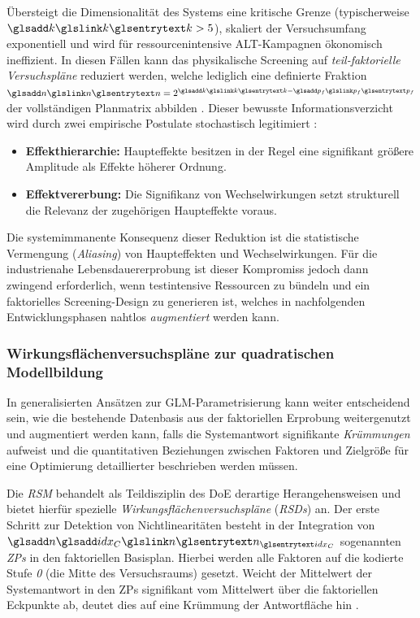 Übersteigt die Dimensionalität des Systems eine kritische Grenze (typischerweise $\sym{k} > 5$), skaliert der Versuchsumfang exponentiell und wird für ressourcenintensive \ac{ALT}-Kampagnen ökonomisch ineffizient.
In diesen Fällen kann das physikalische Screening auf \textit{teil-faktorielle Versuchspläne} reduziert werden, welche lediglich eine definierte Fraktion $\sym{n} = 2^{\sym{k}-\sym{p_f}}$ der vollständigen Planmatrix abbilden \cite{Montgomery.2021,Siebertz.2026}.
Dieser bewusste Informationsverzicht wird durch zwei empirische Postulate stochastisch legitimiert \cite{Montgomery.2021,Rigdon.2022}:
\begin{itemize}
    \item \textbf{Effekthierarchie:} Haupteffekte besitzen in der Regel eine signifikant größere Amplitude als Effekte höherer Ordnung.
    \item \textbf{Effektvererbung:} Die Signifikanz von Wechselwirkungen setzt strukturell die Relevanz der zugehörigen Haupteffekte voraus.
\end{itemize}
Die systemimmanente Konsequenz dieser Reduktion ist die statistische Vermengung (\textit{Aliasing}) von Haupteffekten und Wechselwirkungen.
Für die industrienahe Lebensdauererprobung ist dieser Kompromiss jedoch dann zwingend erforderlich, wenn testintensive Ressourcen zu bündeln und ein faktorielles Screening-Design zu generieren ist, welches in nachfolgenden Entwicklungsphasen nahtlos \textit{augmentiert} werden kann.

\subsubsection{Wirkungsflächenversuchspläne zur quadratischen Modellbildung} \label{subsubsec:rsm}
In generalisierten Ansätzen zur \ac{GLM}-Parametrisierung kann weiter entscheidend sein, wie die bestehende Datenbasis aus der faktoriellen Erprobung weitergenutzt und augmentiert werden kann, falls die Systemantwort signifikante \textit{Krümmungen} aufweist und die quantitativen Beziehungen zwischen Faktoren und Zielgröße für eine Optimierung detaillierter beschrieben werden müssen.

Die \textit{\ac{RSM}} behandelt als Teildisziplin des \ac{DoE} derartige Herangehensweisen und bietet hierfür spezielle \textit{Wirkungsflächenversuchspläne} (\textit{\acp{RSD}}) an.
Der erste Schritt zur Detektion von Nichtlinearitäten besteht in der Integration von $\symsub{n}{idx_C}$ sogenannten \textit{\acp{ZP}} in den faktoriellen Basisplan. Hierbei werden alle Faktoren auf die kodierte Stufe \textit{0} (die Mitte des Versuchsraums) gesetzt.
Weicht der Mittelwert der Systemantwort in den \acp{ZP} signifikant vom Mittelwert über die faktoriellen Eckpunkte ab, deutet dies auf eine Krümmung der Antwortfläche hin \cite{Montgomery.2020}.

